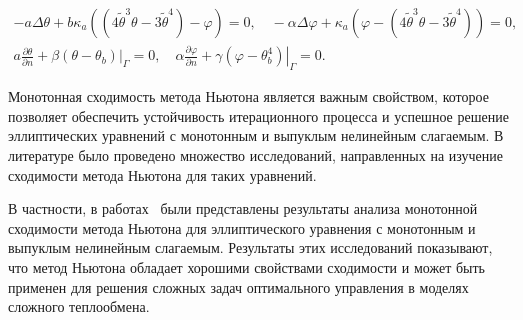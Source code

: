 \[
    \begin{gathered}
        -a \Delta \theta+b \kappa_{a}\left(\left(4 \widetilde{\theta}^{3}
        \theta-3 \widetilde{\theta}^{4}\right)-\varphi\right)=0,
        \quad-\alpha \Delta \varphi
        +\kappa_{a}\left(\varphi
        -\left(4 \widetilde{\theta}^{3}
        \theta-3 \widetilde{\theta}^{4}\right)\right)=0, \\
        a \frac{\partial \theta}{\partial n}
        +\left.\beta\left(\theta-\theta_{b}\right)\right|_{\Gamma}=0,
        \quad \alpha \frac{\partial \varphi}{\partial n}
        +\left.\gamma\left(\varphi-\theta_{b}^{4}\right)\right|_{\Gamma}=0.
    \end{gathered}
\]

Монотонная сходимость метода Ньютона является важным свойством,
которое позволяет обеспечить устойчивость итерационного процесса
и успешное решение эллиптических уравнений
с монотонным и выпуклым нелинейным слагаемым.
В литературе было проведено множество исследований, направленных
на изучение сходимости метода Ньютона для таких уравнений.

В частности, в работах~\cite{Mukhamadiev1971, Schryer1971} были представлены
результаты анализа монотонной сходимости метода Ньютона для эллиптического
уравнения с монотонным и выпуклым нелинейным слагаемым.
Результаты этих исследований показывают, что метод Ньютона обладает
хорошими свойствами сходимости и может быть применен для решения
сложных задач оптимального управления в моделях сложного теплообмена.


